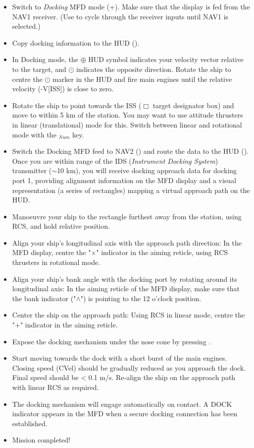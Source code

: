 \documentclass[Orbiter User Manual.tex]{subfiles}
\begin{document}
\begin{itemize}
\item Switch to \textit{Docking} MFD mode (\Shift{}+\Shift{}). Make sure that the display is fed from the NAV1 receiver. (Use \Shift{} to cycle through the receiver inputs until NAV1 is selected.)
\item Copy docking information to the HUD (\Shift{}).
\item In Docking mode, the $\oplus$ HUD symbol indicates your velocity vector relative to the target, and $\odot$ indicates the opposite direction. Rotate the ship to centre the $\odot$ marker in the HUD and fire main engines until the relative velocity (-V[ISS]) is close to zero.
\item Rotate the ship to point towards the ISS ($\Box$ target designator box) and move to within 5 km of the station. You may want to use attitude thrusters in linear (translational) mode for this. Switch between linear and rotational mode with the \keystroke{/}$_{Num}$ key.
\item Switch the Docking MFD feed to NAV2 (\Shift{}) and route the data to the HUD (\Shift{}). Once you are within range of the IDS (\textit{Instrument Docking System}) transmitter ($\sim$10 km), you will receive docking approach data for docking port 1, providing alignment information on the MFD display and a visual representation (a series of rectangles) mapping a virtual approach path on the HUD.
\item Manoeuvre your ship to the rectangle furthest away from the station, using RCS, and hold relative position.
\item Align your ship's longitudinal axis with the approach path direction: In the MFD display, centre the "$\times$" indicator in the aiming reticle, using RCS thrusters in rotational mode.
\item Align your ship's bank angle with the docking port by rotating around its longitudinal axis: In the aiming reticle of the MFD display, make sure that the bank indicator ("$\wedge$") is pointing to the 12 o'clock position.
\item Center the ship on the approach path: Using RCS in linear mode, centre the "+" indicator in the aiming reticle.
\item Expose the docking mechanism under the nose cone by pressing .
\item Start moving towards the dock with a short burst of the main engines. Closing speed (CVel) should be gradually reduced as you approach the dock. Final speed should be < 0.1 m/s. Re-align the ship on the approach path with linear RCS as required.
\item The docking mechanism will engage automatically on contact. A DOCK indicator appears in the MFD when a secure docking connection has been established.
\item Mission completed!
\end{itemize}
\end{document}

